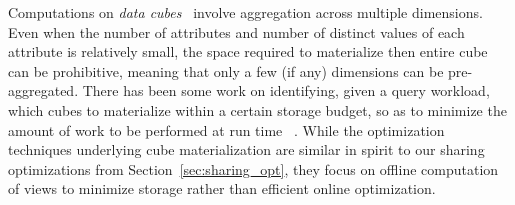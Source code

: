 Computations on {\em data cubes}~\cite{DBLP:jounral/DMKD/GrayCBLR97}
involve aggregation across multiple dimensions.
Even when the number of attributes and number
of distinct values of each attribute is relatively small,
the space required to materialize then entire cube can be prohibitive,
meaning that only a few (if any) dimensions can be pre-aggregated.
There has been some work on identifying, given a query workload,
which cubes to materialize within a certain storage budget,
so as to minimize the amount of work to be performed at run time
~\cite{DBLP:conf/VLDB/AgarwalADG96,DBLP:conf/SIGMOD/HarinarayanRU96}.
While the optimization techniques underlying cube materialization 
are similar in spirit to our sharing optimizations from Section~\ref{sec:sharing_opt},
they focus on offline computation of views to minimize storage rather than efficient online
optimization.



